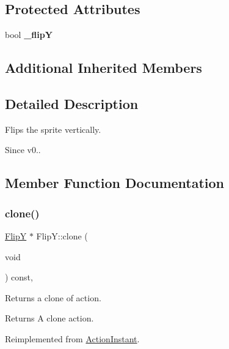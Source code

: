 \subsection*{Protected Attributes}
\begin{DoxyCompactItemize}
\item 
\mbox{\label{classFlipY_acf4d7e22d6649ca0c806a5e7300ed03e}} 
bool {\bfseries \+\_\+flipY}
\end{DoxyCompactItemize}
\subsection*{Additional Inherited Members}


\subsection{Detailed Description}
Flips the sprite vertically. 

\begin{DoxySince}{Since}
v0.. 
\end{DoxySince}


\subsection{Member Function Documentation}
\mbox{\label{classFlipY_a03fd09bf5754b23d7396d46bb4f594b2}} 
\subsubsection{\texorpdfstring{clone()}{clone()}\hspace{0.1cm}{\footnotesize\ttfamily [1/2]}}
{\footnotesize\ttfamily \hyperlink{classFlipY}{FlipY} $\ast$ Flip\+Y\+::clone (\begin{DoxyParamCaption}\item[{void}]{ }\end{DoxyParamCaption}) const\hspace{0.3cm}{\ttfamily [override]}, {\ttfamily [virtual]}}

Returns a clone of action.

\begin{DoxyReturn}{Returns}
A clone action. 
\end{DoxyReturn}


Reimplemented from \hyperlink{classActionInstant_adb76fc6f006098109e8256210cbd8cc0}{Action\+Instant}.

